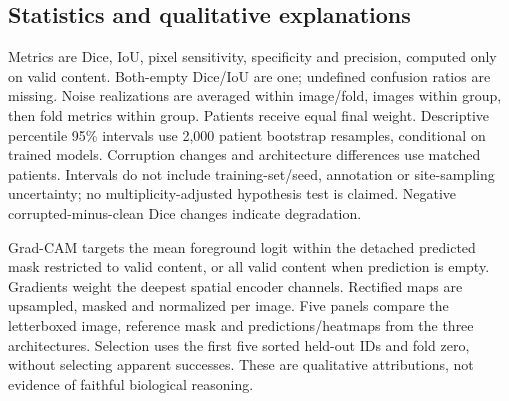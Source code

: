 \documentclass[11pt]{article}
\begin{document}
\subsection{Statistics and qualitative explanations}
Metrics are Dice, IoU, pixel sensitivity, specificity and precision, computed only on valid content. Both-empty Dice/IoU are one; undefined confusion ratios are missing. Noise realizations are averaged within image/fold, images within group, then fold metrics within group. Patients receive equal final weight. Descriptive percentile 95\% intervals use 2,000 patient bootstrap resamples, conditional on trained models. Corruption changes and architecture differences use matched patients. Intervals do not include training-set/seed, annotation or site-sampling uncertainty; no multiplicity-adjusted hypothesis test is claimed. Negative corrupted-minus-clean Dice changes indicate degradation.

Grad-CAM \cite{gradcam} targets the mean foreground logit within the detached predicted mask restricted to valid content, or all valid content when prediction is empty. Gradients weight the deepest spatial encoder channels. Rectified maps are upsampled, masked and normalized per image. Five panels compare the letterboxed image, reference mask and predictions/heatmaps from the three architectures. Selection uses the first five sorted held-out IDs and fold zero, without selecting apparent successes. These are qualitative attributions, not evidence of faithful biological reasoning.
\end{document}
